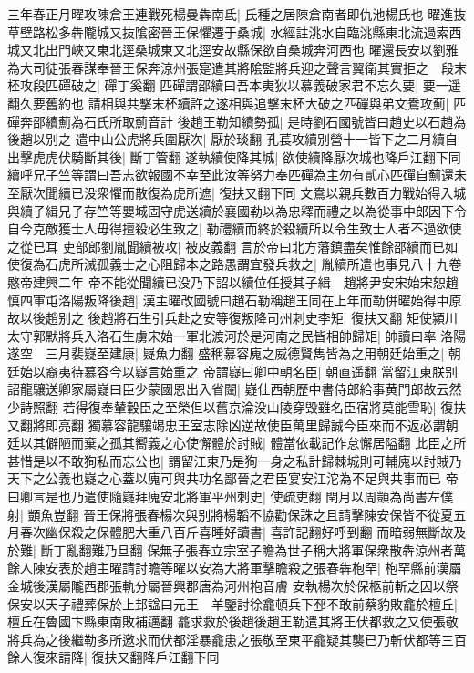 三年春正月曜攻陳倉王連戰死楊曼犇南氐|{
	氏種之居陳倉南者即仇池楊氏也}
曜進抜草壁路松多犇隴城又抜隂密晉王保懼遷于桑城|{
	水經註洮水自臨洮縣東北流過索西城又北出門峽又東北逕桑城東又北逕安故縣保欲自桑城奔河西也}
曜還長安以劉雅為大司徒張春謀奉晉王保奔涼州張寔遣其將隂監將兵迎之聲言翼衛其實拒之　段末柸攻段匹磾破之|{
	磾丁奚翻}
匹磾謂邵續曰吾本夷狄以慕義破家君不忘久要|{
	要一遥翻久要舊約也}
請相與共擊末柸續許之遂相與追擊末柸大破之匹磾與弟文鴦攻薊|{
	匹磾奔邵續薊為石氏所取薊音計}
後趙王勒知續勢孤|{
	是時劉石國號皆曰趙史以石趙為後趙以别之}
遣中山公虎將兵圍厭次|{
	厭於琰翻}
孔萇攻續别營十一皆下之二月續自出擊虎虎伏騎斷其後|{
	斷丁管翻}
遂執續使降其城|{
	欲使續降厭次城也降戶江翻下同}
續呼兄子竺等謂曰吾志欲報國不幸至此汝等努力奉匹磾為主勿有貳心匹磾自薊還未至厭次聞續已没衆懼而散復為虎所遮|{
	復扶又翻下同}
文鴦以親兵數百力戰始得入城與續子緝兄子存竺等嬰城固守虎送續於襄國勒以為忠釋而禮之以為從事中郎因下令自今克敵獲士人毋得擅殺必生致之|{
	勒禮續而終於殺續所以令生致士人者不過欲使之從已耳}
吏部郎劉胤聞續被攻|{
	被皮義翻}
言於帝曰北方藩鎮盡矣惟餘邵續而已如使復為石虎所滅孤義士之心阻歸本之路愚謂宜發兵救之|{
	胤續所遣也事見八十九卷愍帝建興二年}
帝不能從聞續已没乃下詔以續位任授其子緝　趙將尹安宋始宋恕趙慎四軍屯洛陽叛降後趙|{
	漢主曜改國號曰趙石勒稱趙王同在上年而勒併曜始得中原故以後趙别之}
後趙將石生引兵赴之安等復叛降司州刺史李矩|{
	復扶又翻}
矩使潁川太守郭默將兵入洛石生虜宋始一軍北渡河於是河南之民皆相帥歸矩|{
	帥讀曰率}
洛陽遂空　三月裴嶷至建康|{
	嶷魚力翻}
盛稱慕容廆之威德賢雋皆為之用朝廷始重之|{
	朝廷始以裔夷待慕容今以嶷言始重之}
帝謂嶷曰卿中朝名臣|{
	朝直遥翻}
當留江東朕别詔龍驤送卿家屬嶷曰臣少蒙國恩出入省闥|{
	嶷仕西朝歷中書侍郎給事黄門郎故云然少詩照翻}
若得復奉輦轂臣之至榮但以舊京淪没山陵穿毁雖名臣宿將莫能雪恥|{
	復扶又翻將即亮翻}
獨慕容龍驤竭忠王室志除凶逆故使臣萬里歸誠今臣來而不返必謂朝廷以其僻陋而棄之孤其嚮義之心使懈體於討賊|{
	體當依載記作怠懈居隘翻}
此臣之所甚惜是以不敢狥私而忘公也|{
	謂留江東乃是狥一身之私計歸棘城則可輔廆以討賊乃天下之公義也嶷之心蓋以廆可與共功名鄙晉之君臣宴安江沱為不足與共事而已}
帝曰卿言是也乃遣使隨嶷拜廆安北將軍平州刺史|{
	使疏吏翻}
閏月以周顗為尚書左僕射|{
	顗魚豈翻}
晉王保將張春楊次與别將楊韜不協勸保誅之且請擊陳安保皆不從夏五月春次幽保殺之保體肥大重八百斤喜睡好讀書|{
	喜許記翻好呼到翻}
而暗弱無斷故及於難|{
	斷丁亂翻難乃旦翻}
保無子張春立宗室子瞻為世子稱大將軍保衆散犇涼州者萬餘人陳安表於趙主曜請討瞻等曜以安為大將軍擊瞻殺之張春犇枹罕|{
	枹罕縣前漢屬金城後漢屬隴西郡張軌分屬晉興郡唐為河州枹音膚}
安執楊次於保柩前斬之因以祭保安以天子禮葬保於上邽諡曰元王　羊鑒討徐龕頓兵下邳不敢前蔡豹敗龕於檀丘|{
	檀丘在魯國卞縣東南敗補邁翻}
龕求救於後趙後趙王勒遣其將王伏都救之又使張敬將兵為之後繼勒多所邀求而伏都淫暴龕患之張敬至東平龕疑其襲已乃斬伏都等三百餘人復來請降|{
	復扶又翻降戶江翻下同}
